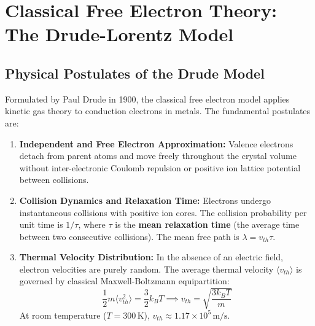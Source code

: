 \section{Classical Free Electron Theory: The Drude-Lorentz Model}
\subsection{Physical Postulates of the Drude Model}
Formulated by Paul Drude in 1900, the classical free electron model applies kinetic gas theory to conduction electrons in metals. The fundamental postulates are:
\begin{enumerate}
    \item \textbf{Independent and Free Electron Approximation:} Valence electrons detach from parent atoms and move freely throughout the crystal volume without inter-electronic Coulomb repulsion or positive ion lattice potential between collisions.
    \item \textbf{Collision Dynamics and Relaxation Time:} Electrons undergo instantaneous collisions with positive ion cores. The collision probability per unit time is $1/\tau$, where $\tau$ is the \textbf{mean relaxation time} (the average time between two consecutive collisions). The mean free path is $\lambda = v_{th} \tau$.
    \item \textbf{Thermal Velocity Distribution:} In the absence of an electric field, electron velocities are purely random. The average thermal velocity $\langle v_{th} \rangle$ is governed by classical Maxwell-Boltzmann equipartition:
    \begin{equation}
        \frac{1}{2} m \langle v_{th}^2 \rangle = \frac{3}{2} k_B T \implies v_{th} = \sqrt{\frac{3 k_B T}{m}}
    \end{equation}
    At room temperature ($T = 300\,\text{K}$), $v_{th} \approx 1.17 \times 10^5\,\text{m/s}$.
\end{enumerate}

